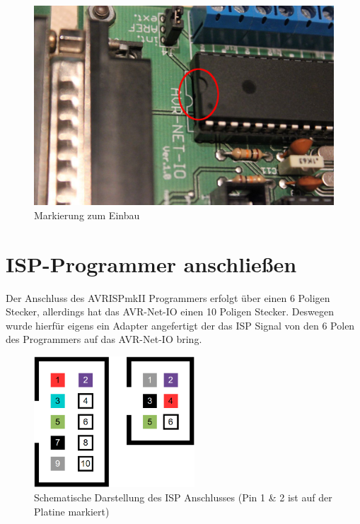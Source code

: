 \begin{figure}[H]
\centering
\includegraphics[width=13cm]{content/pictures/Anleitung/tauscheProzessor/4_Markierung.jpg}
\caption{Markierung zum Einbau}
\label{ausbau4}
\end{figure}

\section{ISP-Programmer anschließen}

Der Anschluss des AVRISPmkII Programmers erfolgt über einen 6 Poligen Stecker,
allerdings hat das AVR-Net-IO einen 10 Poligen Stecker. Deswegen wurde hierfür
eigens ein Adapter angefertigt der das ISP Signal von den 6 Polen des Programmers
auf das AVR-Net-IO bring.

\begin{figure}[htp]
\begin{center}
  \includegraphics[width=6cm]{content/pictures/Anleitung/ISP-Stecker.png}
  \caption[Schematische Darstellung des ISP Anschlusses]{Schematische Darstellung des ISP Anschlusses (Pin 1 \& 2
  ist auf der Platine markiert)}
  \label{ispanschluss}
\end{center}
\end{figure}

